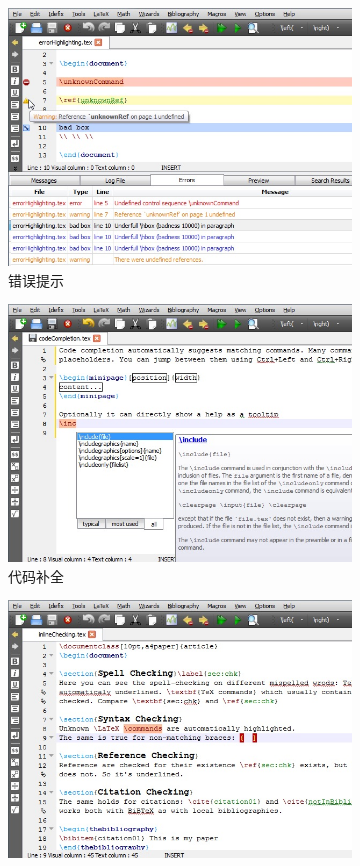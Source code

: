 \begin{figure}[htb!]
    \centering
    \begin{subfigure}{.3\textwidth}
        \centering
        \includegraphics[width=.9\textwidth]{./img/texstudio1.jpeg}
        \caption{错误提示}
        \label{fig_texstudio_1}
    \end{subfigure}
    \begin{subfigure}{.3\textwidth}
        \centering
        \includegraphics[width=.9\textwidth]{./img/texstudio2.jpeg}
        \caption{代码补全}
        \label{fig_texstudio_2}
    \end{subfigure}
    \begin{subfigure}{.3\textwidth}
        \centering
        \includegraphics[width=.9\textwidth]{./img/texstudio3.jpeg}

\end{subfigure}
\end{figure}
